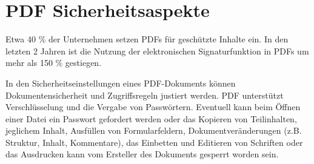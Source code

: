 \section{PDF Sicherheitsaspekte}
Etwa 40 \% der Unternehmen setzen PDFs für geschützte Inhalte ein. In den letzten 2 Jahren ist die Nutzung der elektronischen Signaturfunktion in PDFs um mehr als 150 \% gestiegen. \cite{formilo}
\par
In den Sicherheitseinstellungen eines PDF-Dokuments können Dokumentensicherheit und Zugriffsregeln justiert werden. PDF unterstützt Verschlüsselung und die Vergabe von Passwörtern. Eventuell kann beim Öffnen einer Datei ein Passwort gefordert werden oder das Kopieren von Teilinhalten, jeglichem Inhalt, Ausfüllen von Formularfeldern, Dokumentveränderungen (z.B. Struktur, Inhalt, Kommentare), das Einbetten und Editieren von Schriften oder das Ausdrucken kann vom Ersteller des Dokuments gesperrt worden sein. 
\cite{adobe-pdf-pades}

